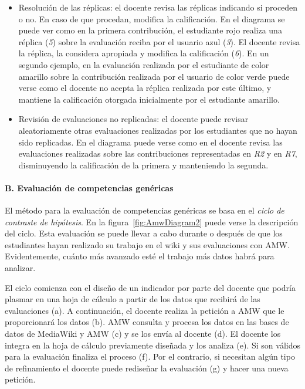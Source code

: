 			\begin{itemize}
				\item Resolución de las réplicas: el docente revisa las réplicas indicando si proceden o no. En caso de que procedan, modifica la calificación. En el diagrama se puede ver como en la primera contribución, el estudiante rojo realiza una réplica (\emph{5}) sobre la evaluación reciba por el usuario azul (\emph{3}). El docente revisa la réplica, la considera apropiada y modifica la calificación (\emph{6}). En un segundo ejemplo, en la evaluación realizada por el estudiante de color amarillo sobre la contribución realizada por el usuario de color verde puede verse como el docente no acepta la réplica realizada por este último, y mantiene la calificación otorgada inicialmente por el estudiante amarillo.
				\item Revisión de evaluaciones no replicadas: el docente puede revisar aleatoriamente otras evaluaciones realizadas por los estudiantes que no hayan sido replicadas. En el diagrama puede verse como en el docente revisa las evaluaciones realizadas sobre las contribuciones representadas en \emph{R2} y en \emph{R7}, disminuyendo la calificación de la primera y manteniendo la segunda.
			\end{itemize}

			\paragraph*{B. Evaluación de competencias genéricas}

			El método para la evaluación de competencias genéricas se basa en el \emph{ciclo de contraste de hipótesis}. En la figura~\ref{fig:AmwDiagram2} puede verse la descripción del ciclo. Esta evaluación se puede llevar a cabo durante o después de que los estudiantes hayan realizado su trabajo en el wiki y sus evaluaciones con AMW. Evidentemente, cuánto más avanzado esté el trabajo más datos habrá para analizar. 

			El ciclo comienza con el diseño de un indicador por parte del docente que podría plasmar en una hoja de cálculo a partir de los datos que recibirá de las evaluaciones (a). A continuación, el docente realiza la petición a AMW que le proporcionará los datos (b). AMW consulta y procesa los datos en las bases de datos de MediaWiki y AMW (c) y se los envía al docente (d). El docente los integra en la hoja de cálculo previamente diseñada y los analiza (e). Si son válidos para la evaluación finaliza el proceso (f). Por el contrario, si necesitan algún tipo de refinamiento el docente puede rediseñar la evaluación (g) y hacer una nueva petición.


